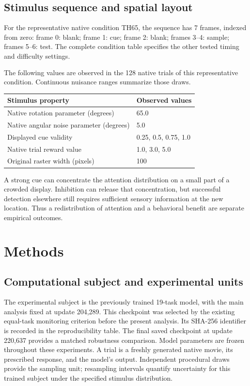 \documentclass[11pt]{article}
\begin{document}
\subsection{Stimulus sequence and spatial layout}
For the representative native condition TH65, the sequence has 7 frames, indexed from zero: frame 0: blank; frame 1: cue; frame 2: blank; frames 3--4: sample; frames 5--6: test. The complete condition table specifies the other tested timing and difficulty settings.

The following values are observed in the 128 native trials of this representative condition. Continuous nuisance ranges summarize those draws.
\begin{center}\small\begin{tabular}{p{}p{}}\toprule Stimulus property & Observed values\\\midrule
Native rotation parameter (degrees) & 65.0\\
Native angular noise parameter (degrees) & 5.0\\
Displayed cue validity & 0.25, 0.5, 0.75, 1.0\\
Native trial reward value & 1.0, 3.0, 5.0\\
Original raster width (pixels) & 100\\
\bottomrule\end{tabular}\normalsize\end{center}
A strong cue can concentrate the attention distribution on a small part of a crowded display. Inhibition can release that concentration, but successful detection elsewhere still requires sufficient sensory information at the new location. Thus a redistribution of attention and a behavioral benefit are separate empirical outcomes.


\section{Methods}
\subsection{Computational subject and experimental units}
The experimental subject is the previously trained 19-task model, with the main analysis fixed at update 204,289. This checkpoint was selected by the existing equal-task monitoring criterion before the present analysis. Its SHA-256 identifier is recorded in the reproducibility table. The final saved checkpoint at update 220,637 provides a matched robustness comparison. Model parameters are frozen throughout these experiments. A trial is a freshly generated native movie, its prescribed response, and the model's output. Independent procedural draws provide the sampling unit; resampling intervals quantify uncertainty for this trained subject under the specified stimulus distribution.
\end{document}
